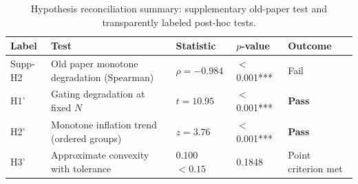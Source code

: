 \begin{table}[htbp]
\centering
\caption{Hypothesis reconciliation summary: supplementary old-paper test and transparently labeled post-hoc tests.}
\label{tab:hypothesis_reconciliation}
\small
\begin{tabular}{@{}lllll@{}}
\toprule
Label & Test & Statistic & $p$-value & Outcome \\
\midrule
  Supp-H2 & Old paper monotone degradation (Spearman) & $\rho=-0.984$ & $<$0.001*** & Fail \\
  H1' & Gating degradation at fixed $N$ & $t=10.95$ & $<$0.001*** & \textbf{Pass} \\
  H2' & Monotone inflation trend (ordered groups) & $z=3.76$ & $<$0.001*** & \textbf{Pass} \\
  H3' & Approximate convexity with tolerance & 0.100 $< 0.15$ & 0.1848 & Point criterion met \\
\bottomrule
\end{tabular}
\end{table}
